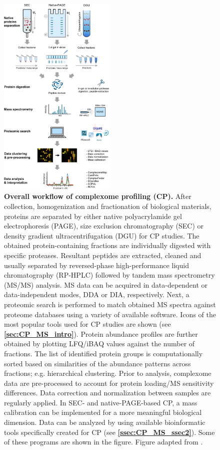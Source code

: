 \begin{figure}[hbt!]
    \center
    \includegraphics[width=0.5\textwidth]{Chapter.1/Figures/Figure5.png} 
    \caption{\textbf{Overall workflow of complexome profiling (CP).} After collection, homogenization and fractionation of biological materials, proteins are separated by either native polyacrylamide gel electrophoresis (PAGE), size exclusion chromatography (SEC) or density gradient ultracentrifugation (DGU) for CP studies. The obtained protein-containing fractions are individually digested with specific proteases. Resultant peptides are extracted, cleaned and usually separated by reversed-phase high-performance liquid chromatography (RP-HPLC) followed by tandem mass spectrometry (MS/MS) analysis. MS data can be acquired in data-dependent or data-independent modes, DDA or DIA, respectively. Next, a proteomic search is performed to match obtained MS spectra against proteome databases using a variety of available software. Icons of the most popular tools used for CP studies are shown (see \textbf{\autoref{sec:CP_MS_intro}}). Protein abundance profiles are further obtained by plotting LFQ/iBAQ values against the number of fractions. The list of identified protein groups is computationally sorted based on similarities of the abundance patterns across fractions; e.g. hierarchical clustering. Prior to analysis, complexome data are pre-processed to account for protein loading/MS sensitivity differences. Data correction and normalization between samples are regularly applied. In SEC- and native-PAGE-based CP, a mass calibration can be implemented for a more meaningful biological dimension. Data can be analyzed by using available bioinformatic tools specifically created for CP (see \textbf{\autoref{ssec:CP_MS_ssec2}}). Some of these programs are shown in the figure. Figure adapted from \cite{Cabrera-Orefice_2022}.}
    \label{fig:fig5}
    \end{figure}
\clearpage

